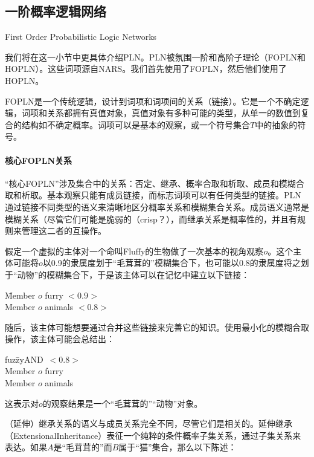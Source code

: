 \subsection{一阶概率逻辑网络}{First Order Probabilistic Logic Networks}

我们将在这一小节中更具体介绍PLN。PLN被氛围一阶和高阶子理论（FOPLN和HOPLN）。这些词项源自NARS\cite{Wang2006}。我们首先使用了FOPLN，然后他们使用了HOPLN。

FOPLN是一个传统逻辑，设计到词项和词项间的关系（链接）。它是一个不确定逻辑，词项和关系都拥有真值对象，真值对象有多种可能的类型，从单一的数值到复合的结构如不确定概率。词项可以是基本的观察，或一个符号集合$T$中的抽象的符号。

\paragraph{核心FOPLN关系}

“核心FOPLN”涉及集合中的关系：否定、继承、概率合取和析取、成员和模糊合取和析取。基本观察只能有成员链接，而标志词项可以有任何类型的链接。PLN通过链接不同类型的语义来清晰地区分概率关系和模糊集合关系。成员语义通常是模糊关系（尽管它们可能是脆弱的（crisp？），而继承关系是概率性的，并且有规则来管理这二者的互操作。

假定一个虚拟的主体对一个命叫Fluffy的生物做了一次基本的视角观察$o$。这个主体可能将$o$以0.9的隶属度划于“毛茸茸的”模糊集合下，也可能以0.8的隶属度将之划于“动物”的模糊集合下，于是该主体可以在记忆中建立以下链接：

 \begin{tabbing}
\=Member $o$ furry $<0.9>$\\
\>Member $o$ animals $<0.8>$\\
\end{tabbing}

随后，该主体可能想要通过合并这些链接来完善它的知识。使用最小化的模糊合取操作，该主体可能会总结出：

 \begin{tabbing}
fuz\=zyAND\ $<0.8>$\\
\> Member $o$ furry \\
\> Member $o$ animals \\
\end{tabbing}

这表示对$o$的观察结果是一个“毛茸茸的”“动物”对象。

（延伸）继承关系的语义与成员关系完全不同，尽管它们是相关的。延伸继承（ExtensionalInheritance）表征一个纯粹的条件概率子集关系，通过子集关系来表达。如果$A$是“毛茸茸的”而$B$属于“猫”集合，那么以下陈述：


